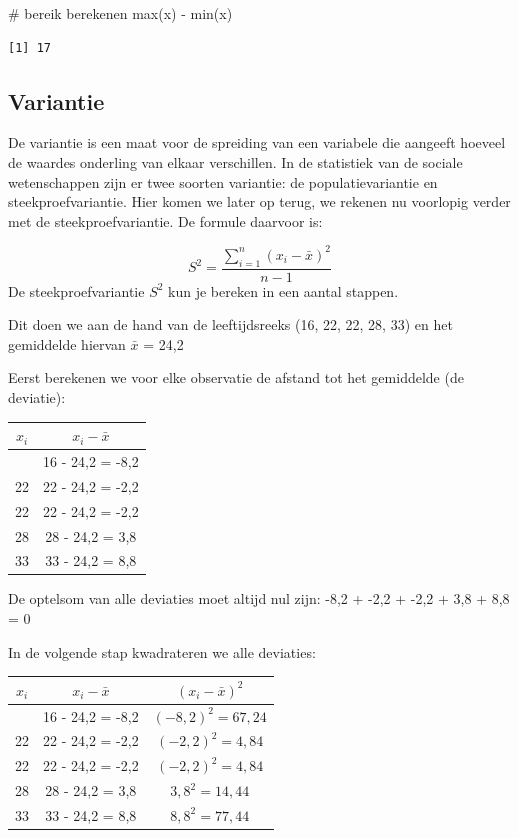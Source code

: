 \documentclass[
  letterpaper,
  DIV=11,
  numbers=noendperiod]{scrreprt}
\newenvironment{Shaded}{\begin{snugshade}}{\end{snugshade}}
\newcommand{\CommentTok}[1]{\textcolor[rgb]{0.37,0.37,0.37}{#1}}
\newcommand{\FunctionTok}[1]{\textcolor[rgb]{0.28,0.35,0.67}{#1}}
\newcommand{\NormalTok}[1]{\textcolor[rgb]{0.00,0.23,0.31}{#1}}
\newcommand{\SpecialCharTok}[1]{\textcolor[rgb]{0.37,0.37,0.37}{#1}}
\newcounter{none} %
\begin{document}
\begin{Shaded}
\begin{Highlighting}[]
\CommentTok{\# bereik berekenen}
\FunctionTok{max}\NormalTok{(x) }\SpecialCharTok{{-}} \FunctionTok{min}\NormalTok{(x)}
\end{Highlighting}
\end{Shaded}

\begin{verbatim}
[1] 17
\end{verbatim}

\subsection{Variantie}\label{variantie}

De variantie is een maat voor de spreiding van een variabele die
aangeeft hoeveel de waardes onderling van elkaar verschillen. In de
statistiek van de sociale wetenschappen zijn er twee soorten variantie:
de populatievariantie en steekproefvariantie. Hier komen we later op
terug, we rekenen nu voorlopig verder met de steekproefvariantie. De
formule daarvoor is:

\[
S^2=\frac{\sum_{i=1}^{n}{(x_i-\bar{x})^2}}{n-1}
\] De steekproefvariantie \(S^2\) kun je bereken in een aantal stappen.

Dit doen we aan de hand van de leeftijdsreeks (16, 22, 22, 28, 33) en
het gemiddelde hiervan \(\bar{x}\) = 24,2

Eerst berekenen we voor elke observatie de afstand tot het gemiddelde
(de deviatie):

{\def\LTcaptype{none} %
\begin{longtable}[]{@{}cc@{}}
\toprule\noalign{}
\(x_i\) & \(x_i-\bar{x}\) \\
\midrule\noalign{}
\endhead
\bottomrule\noalign{}
\endlastfoot
16 & 16 - 24,2 = -8,2 \\
22 & 22 - 24,2 = -2,2 \\
22 & 22 - 24,2 = -2,2 \\
28 & 28 - 24,2 = 3,8 \\
33 & 33 - 24,2 = 8,8 \\
\end{longtable}
}

De optelsom van alle deviaties moet altijd nul zijn: -8,2 + -2,2 + -2,2
+ 3,8 + 8,8 = 0

In de volgende stap kwadrateren we alle deviaties:

{\def\LTcaptype{none} %
\begin{longtable}[]{@{}ccc@{}}
\toprule\noalign{}
\(x_i\) & \(x_i-\bar{x}\) & \((x_i-\bar{x})^2\) \\
\midrule\noalign{}
\endhead
\bottomrule\noalign{}
\endlastfoot
16 & 16 - 24,2 = -8,2 & \((-8,2)^2 = 67,24\) \\
22 & 22 - 24,2 = -2,2 & \((-2,2)^2 = 4,84\) \\
22 & 22 - 24,2 = -2,2 & \((-2,2)^2 = 4,84\) \\
28 & 28 - 24,2 = 3,8 & \(3,8^2 = 14,44\) \\
33 & 33 - 24,2 = 8,8 & \(8,8^2 = 77,44\) \\
\end{longtable}
}
\end{document}
